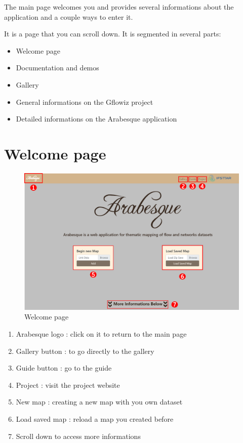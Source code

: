 \documentclass[]{book}
\providecommand{\tightlist}{%
  \setlength{\itemsep}{0pt}\setlength{\parskip}{0pt}}
\begin{document}
The main page welcomes you and provides several informations about the application
and a couple ways to enter it.

It is a page that you can scroll down. It is segmented in several parts:

\begin{itemize}
\tightlist
\item
  Welcome page
\item
  Documentation and demos
\item
  Gallery
\item
  General informations on the Gflowiz project
\item
  Detailed informations on the Arabesque application
\end{itemize}

\hypertarget{welcome-page}{%
\section{Welcome page}\label{welcome-page}}

\begin{figure}
\centering
\includegraphics{images/main/01_arabesque_acceuil.png}
\caption{Welcome page}
\end{figure}

\begin{enumerate}
\def\labelenumi{\arabic{enumi}.}
\tightlist
\item
  Arabesque logo : click on it to return to the main page
\item
  Gallery button : to go directly to the gallery
\item
  Guide button : go to the guide
\item
  Project : visit the project website
\item
  New map : creating a new map with you own dataset
\item
  Load saved map : reload a map you created before
\item
  Scroll down to access more informations
\end{enumerate}
\end{document}
